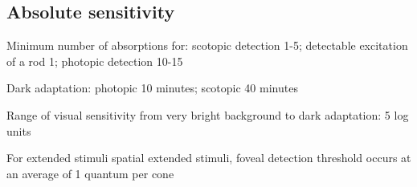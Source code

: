 \subsection*{Absolute sensitivity}

\be
\item Minimum number of absorptions for: scotopic detection 1-5;
detectable excitation of a rod 1; photopic detection 10-15

\item Dark adaptation: photopic 10 minutes; scotopic 40 minutes

\item Range of visual sensitivity from very bright background
to dark adaptation:  5 log units

\item For extended stimuli spatial extended stimuli, foveal
detection threshold occurs at an average of 1 quantum per cone 

\ee

